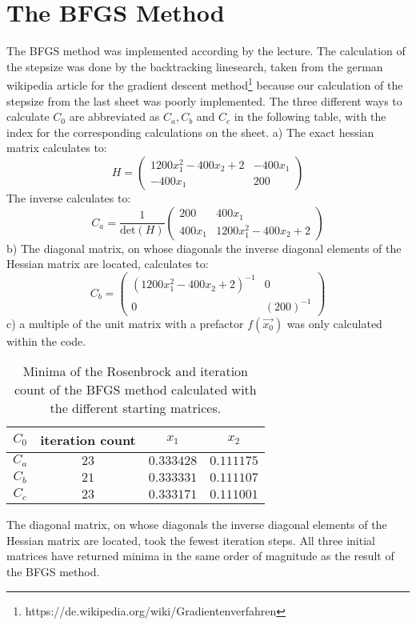 \section{The BFGS Method}
 The BFGS method was implemented according by the lecture. 
 The calculation of the stepsize was done by the backtracking linesearch, taken from the german wikipedia article for the gradient descent method\footnote{https://de.wikipedia.org/wiki/Gradientenverfahren} because our calculation of the stepsize from the last sheet was poorly implemented.
 The three different ways to calculate $C_0$ are abbreviated as $C_a,C_b$ and $C_c$ in the following table, with the index for the corresponding calculations on the sheet.
 a) The exact hessian matrix calculates to:
 \begin{equation}
   H = \begin{pmatrix} 1200x_1^2 - 400x_2+2 & -400x_1 \\ -400x_1 & 200 \end{pmatrix}
 \end{equation}
 The inverse calculates to:
 \begin{equation}
   C_a = \frac{1}{\text{det}(H)} \begin{pmatrix} 200 & 400x_1 \\ 400x_1 & 1200x_1^2 - 400x_2+2 \end{pmatrix}
 \end{equation}
 b) The diagonal matrix, on whose diagonals the inverse diagonal elements of the Hessian matrix are located, calculates to:
  \begin{equation}
  C_b = \begin{pmatrix} (1200x_1^2 - 400x_2+2)^{-1} & 0 \\ 0 & (200)^{-1} \end{pmatrix}
 \end{equation}
 c) a multiple of the unit matrix with a prefactor $f(\vec{x_0})$ was only calculated within the code.
 \begin{table}[h]
    \centering
    \caption{Minima of the Rosenbrock and iteration count of the BFGS method calculated with the different starting matrices.}
    \label{tab:freq}
    \begin{tabular}{cccc}
        \toprule
        $C_0$ & iteration count & $x_1$ & $x_2$\\
        \midrule
        $C_a$ & $23$ & $0.333428$ & $0.111175$\\
        $C_b$ & $21$ & $0.333331$ & $0.111107$\\
        $C_c$ & $23$ & $0.333171$ & $0.111001$\\
    \end{tabular}
 \end{table}
 The diagonal matrix, on whose diagonals the inverse diagonal elements of the Hessian matrix are located, took the fewest iteration steps.
 All three initial matrices have returned minima in the same order of magnitude as the result of the BFGS method.

